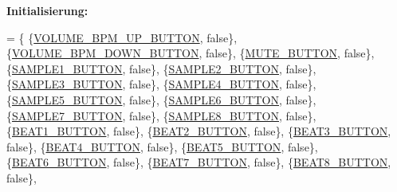 {\bfseries Initialisierung\+:}
\begin{DoxyCode}
= \{
            \{\hyperlink{namespaceinputs_ab1d58fe937ccabff6ec4011a74028bfb}{VOLUME\_BPM\_UP\_BUTTON},   \textcolor{keyword}{false}\},
            \{\hyperlink{namespaceinputs_af3cad6ab00b2670e1710698945d28c17}{VOLUME\_BPM\_DOWN\_BUTTON}, \textcolor{keyword}{false}\},
            \{\hyperlink{namespaceinputs_af0075a72395787966efcec2403306b43}{MUTE\_BUTTON},            \textcolor{keyword}{false}\},
            \{\hyperlink{namespaceinputs_a39dbaf6935309e198c1a0bc6e3468c45}{SAMPLE1\_BUTTON},         \textcolor{keyword}{false}\},
            \{\hyperlink{namespaceinputs_afcf2086c7f58f801e5654d8e573d928c}{SAMPLE2\_BUTTON},         \textcolor{keyword}{false}\},
            \{\hyperlink{namespaceinputs_a17158d35ca30fb91c6f9f757ce0d7ccc}{SAMPLE3\_BUTTON},         \textcolor{keyword}{false}\},
            \{\hyperlink{namespaceinputs_ac9ccac580f0955e454a367ddc6421d78}{SAMPLE4\_BUTTON},         \textcolor{keyword}{false}\},
            \{\hyperlink{namespaceinputs_ad22ade847b4a38fd418dccda07814551}{SAMPLE5\_BUTTON},         \textcolor{keyword}{false}\},
            \{\hyperlink{namespaceinputs_a88edcfa8b89df1abcca33bcec05974c4}{SAMPLE6\_BUTTON},         \textcolor{keyword}{false}\},
            \{\hyperlink{namespaceinputs_a50972dcf524a7b7c420ca75b0ba72a29}{SAMPLE7\_BUTTON},         \textcolor{keyword}{false}\},
            \{\hyperlink{namespaceinputs_a85f389284c616cd584390d04ad192ced}{SAMPLE8\_BUTTON},         \textcolor{keyword}{false}\},
            \{\hyperlink{namespaceinputs_af62021422f469c370f42c78a72504a66}{BEAT1\_BUTTON},           \textcolor{keyword}{false}\},
            \{\hyperlink{namespaceinputs_a8cdd33c9e53b617a2cf8bd32a5b74484}{BEAT2\_BUTTON},           \textcolor{keyword}{false}\},
            \{\hyperlink{namespaceinputs_ab60a6fc2188a034f76d3fbe554efe314}{BEAT3\_BUTTON},           \textcolor{keyword}{false}\},
            \{\hyperlink{namespaceinputs_af65f26f63a9572003a2bc49e7955e319}{BEAT4\_BUTTON},           \textcolor{keyword}{false}\},
            \{\hyperlink{namespaceinputs_a8a027829529daa53a24ece7b8334164b}{BEAT5\_BUTTON},           \textcolor{keyword}{false}\},
            \{\hyperlink{namespaceinputs_a6afdc23bce21454342081cf937e47ab9}{BEAT6\_BUTTON},           \textcolor{keyword}{false}\},
            \{\hyperlink{namespaceinputs_ac74e302394a578b31f0cf44df8cbb1a9}{BEAT7\_BUTTON},           \textcolor{keyword}{false}\},
            \{\hyperlink{namespaceinputs_abfcd4d28221c436391131a27402ea620}{BEAT8\_BUTTON},           \textcolor{keyword}{false}\},

\end{DoxyCode}
